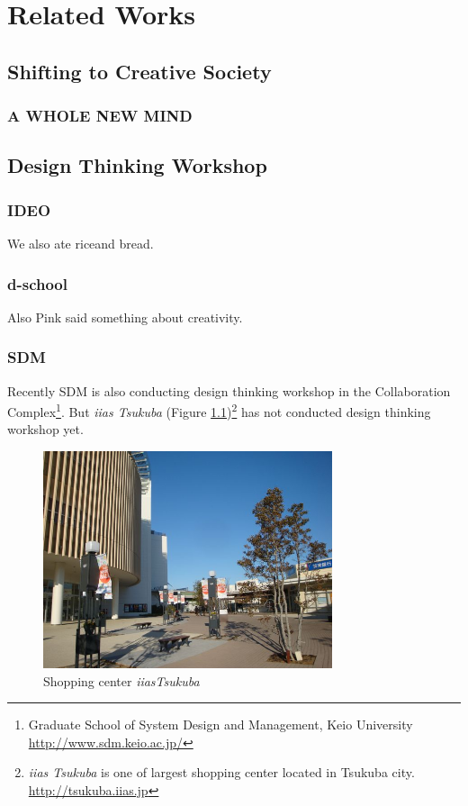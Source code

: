 
\chapter{Related Works}
\label{related}

\makeendnotes  %

\section{Shifting to Creative Society}
\subsection{A WHOLE NEW MIND}


\section{Design Thinking Workshop}
\subsection{IDEO}
We also ate riceand bread.

\subsection{d-school}
Also Pink  said something about creativity.


\subsection{SDM}
Recently SDM is also conducting design thinking workshop in the Collaboration Complex\footnote{Graduate School of System Design and Management, Keio University \\\url{http://www.sdm.keio.ac.jp/}}. But {\it iias Tsukuba} (Figure \ref{iias})\footnote{{\it iias Tsukuba} is one of largest shopping center located in Tsukuba city. \url{http://tsukuba.iias.jp}} has not conducted design thinking workshop yet. 


\begin{figure}[htbp]
\centering
  \includegraphics[width=85mm, bb=0 0 640 480]{figures/iias.jpg}
 \caption{Shopping center {\itshape iiasTsukuba}}
  \label{iias}
\end{figure}


